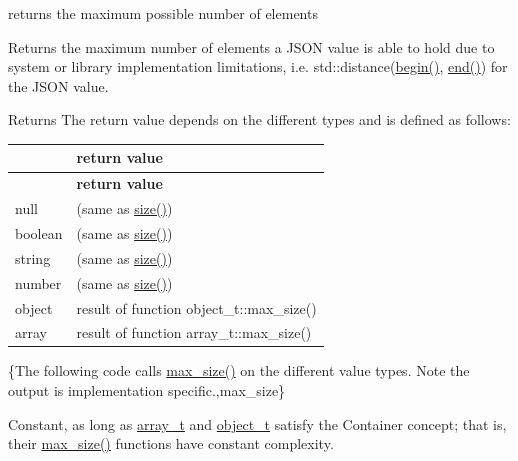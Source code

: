 returns the maximum possible number of elements 

Returns the maximum number of elements a J\+S\+ON value is able to hold due to system or library implementation limitations, i.\+e. {\ttfamily std\+::distance(\hyperlink{classnlohmann_1_1basic__json_a0ff28dac23f2bdecee9564d07f51dcdc}{begin()}, \hyperlink{classnlohmann_1_1basic__json_a13e032a02a7fd8a93fdddc2fcbc4763c}{end()})} for the J\+S\+ON value.

\begin{DoxyReturn}{Returns}
The return value depends on the different types and is defined as follows\+: \tabulinesep=1mm
\begin{longtabu} spread 0pt [c]{*2{|X[-1]}|}
\hline
{}&{\bf return value  }\\
\endfirsthead
\hline
\endfoot
\hline
{}&{\bf return value  }\\
\endhead
null &{} (same as {\ttfamily \hyperlink{classnlohmann_1_1basic__json_a25e27ad0c6d53c01871c5485e1f75b96}{size()}}) \\
boolean &{} (same as {\ttfamily \hyperlink{classnlohmann_1_1basic__json_a25e27ad0c6d53c01871c5485e1f75b96}{size()}}) \\
string &{} (same as {\ttfamily \hyperlink{classnlohmann_1_1basic__json_a25e27ad0c6d53c01871c5485e1f75b96}{size()}}) \\
number &{} (same as {\ttfamily \hyperlink{classnlohmann_1_1basic__json_a25e27ad0c6d53c01871c5485e1f75b96}{size()}}) \\
object &result of function {\ttfamily object\+\_\+t\+::max\+\_\+size()} \\
array &result of function {\ttfamily array\+\_\+t\+::max\+\_\+size()} \\
\end{longtabu}
\{The following code calls {\ttfamily \hyperlink{classnlohmann_1_1basic__json_a2f47d3c6a441c57dd2be00449fbb88e1}{max\+\_\+size()}} on the different value types. Note the output is implementation specific.,max\+\_\+size\}
\end{DoxyReturn}
Constant, as long as \hyperlink{classnlohmann_1_1basic__json_a4c409f1b6d9caf3412c78af9a5883fed}{array\+\_\+t} and \hyperlink{classnlohmann_1_1basic__json_a0322396ca5cd4623bc816bf735377623}{object\+\_\+t} satisfy the Container concept; that is, their {\ttfamily \hyperlink{classnlohmann_1_1basic__json_a2f47d3c6a441c57dd2be00449fbb88e1}{max\+\_\+size()}} functions have constant complexity.

